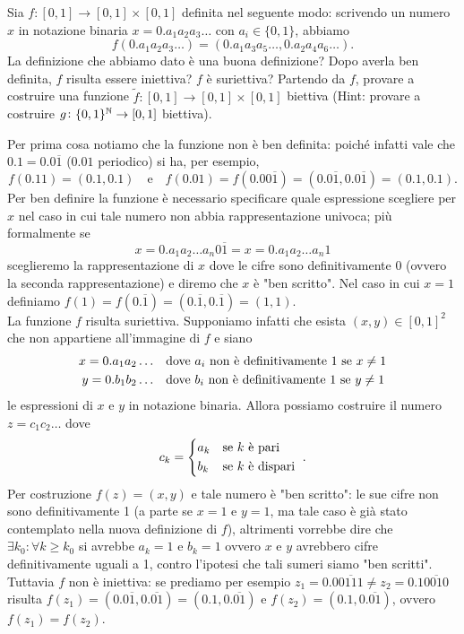 \begin{es}
  Sia $ f \colon [0, 1] \to [0, 1] \times [0, 1] $ definita nel seguente modo: scrivendo un numero $ x $ in notazione binaria $ x = 0.a_1 a_2 a_3 \dots $ con $ a_i \in \{0, 1\} $, abbiamo \[f(0.a_1 a_2 a_3 \dots) = (0.a_1 a_3 a_5 \dots, 0.a_2 a_4 a_6 \dots).\] La definizione che abbiamo dato è una buona definizione? Dopo averla ben definita, $ f $ risulta essere iniettiva? $ f $ è suriettiva? Partendo da $ f $, provare a costruire una funzione $ \tilde f \colon [0, 1] \to [0, 1] \times [0, 1] $ biettiva ({Hint}: provare a costruire $ g \colon \{0, 1\}^{\mathbb{N}} \to [0, 1] $ biettiva).
\end{es}

Per prima cosa notiamo che la funzione non è ben definita: poiché infatti vale che $ 0.1 = 0.0\overline{1} $ ($ 0.01 $ periodico) si ha, per esempio, \[f(0.11) = (0.1, 0.1) \quad \mathrm{e} \quad f(0.01) = f(0.00\overline{1}) = (0.0\overline{1}, 0.0\overline{1}) = (0.1, 0.1).\] Per ben definire la funzione è necessario specificare quale espressione scegliere per $ x $ nel caso in cui tale numero non abbia rappresentazione univoca; più formalmente se \[x = 0.a_1 a_2 \dots a_n 0\overline{1} = x = 0.a_1 a_2 \dots a_n 1\] sceglieremo la rappresentazione di $ x $ dove le cifre sono definitivamente 0 (ovvero la seconda rappresentazione) e diremo che $ x $ è "ben scritto". Nel caso in cui $ x = 1 $ definiamo $ f(1) = f(0.\overline{1}) = (0.\overline{1}, 0.\overline{1}) = (1, 1) $. \\
La funzione $ f $ risulta suriettiva. Supponiamo infatti che esista $ (x, y) \in [0, 1]^2 $ che non appartiene all'immagine di $ f $ e siano
\begin{align*}
  x = 0.a_1 a_2 \dots & \quad \text{dove $ a_i $ non è definitivamente 1 se $ x \neq 1 $} \\
  y = 0.b_1 b_2 \dots & \quad \text{dove $b_i $ non è definitivamente 1 se $ y \neq 1 $}
\end{align*}
le espressioni di $ x $ e $ y $ in notazione binaria. Allora possiamo costruire il numero $ z = c_1 c_2 \dots $ dove
\[c_k =
  \begin{cases*}
    a_k & \text{se $ k $ è pari} \\
    b_k & \text{se $ k $ è dispari}
  \end{cases*}.\]
Per costruzione $ f(z) = (x, y) $ e tale numero è "ben scritto": le sue cifre non sono definitivamente 1 (a parte se $ x = 1 $ e $ y = 1 $, ma tale caso è già stato contemplato nella nuova definizione di $ f $), altrimenti vorrebbe dire che $ \exists k_0 : \forall k \geq k_0 $  si avrebbe $ a_k = 1 $ e $ b_k = 1 $ ovvero $ x $ e $ y $ avrebbero cifre definitivamente uguali a 1,  contro l'ipotesi che tali sumeri siamo "ben scritti". \\
Tuttavia $ f $ non è iniettiva: se prediamo per esempio $ z_1 = 0.0\overline{0111} \neq z_2 = 0.1\overline{0010} $ risulta $ f(z_1) = (0.0\overline{1}, 0.\overline{01}) = (0.1, 0.\overline{01}) $ e $ f(z_2) = (0.1, 0.\overline{01}) $, ovvero $ f(z_1) = f(z_2) $. \\

